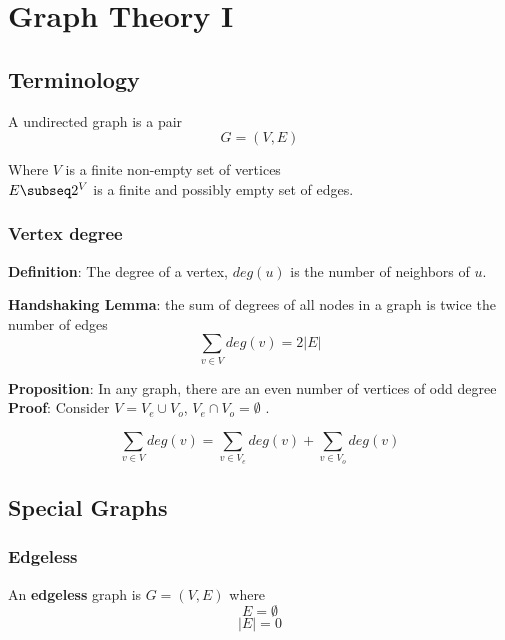 \chapter{Graph Theory I}

\section{Terminology}
\begin{framed}
   A undirected graph is a pair 
   \[
     G = (V, E)
   \] 

   Where $V$ is a finite non-empty set of vertices \\

   $E \subseq 2^V$ is a finite and possibly empty set of edges. 
\end{framed}

\subsection{Vertex degree}
\begin{framed}
   \textbf{Definition}: The degree of a vertex, $deg(u)$ is the number of neighbors of $u$. 
\end{framed}

\begin{framed}
   \textbf{Handshaking Lemma}: the sum of degrees of all nodes in a graph is twice the number of edges
   \[
      \sum_{v \in V} deg(v) = 2 |E|
   \] 
\end{framed}

\begin{framed}
   \textbf{Proposition}: In any graph, there are an even number of vertices of odd degree \\


   \textbf{Proof}: Consider $V = V_e \cup V_o$, $V_e \cap V_o = \emptyset$ . 

   \[
      \sum_{v \in V} deg(v) = \sum_{v \in V_e} deg(v) + \sum_{v \in V_o} deg(v)
   \] 
  
\end{framed}

\section{Special Graphs}

\subsection{Edgeless}
\begin{framed}
   An \textbf{edgeless } graph is $G = (V, E)$ where
   \[
     E = \emptyset
   \] 
   \[
     |E| = 0
   \] 
\end{framed}


